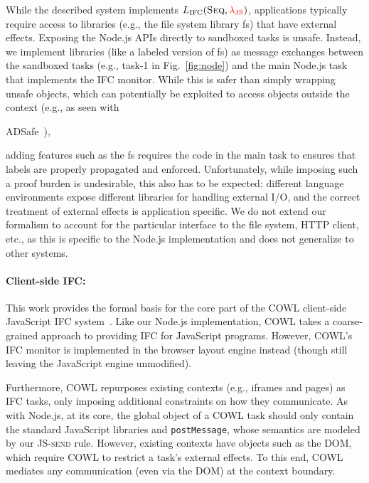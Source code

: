 \documentclass{llncs}
\newif\ifextended
\newcommand{\Red}[1]{{\color{red} #1}}
\begin{document}
While the described system implements \ensuremath{L_\text{IFC}(\textsc{Seq},\Red{\lambda_{\text{JS}}})}, applications
typically require access to libraries (e.g., the file system library
\textsf{fs}) that have external effects.
Exposing the Node.js APIs directly to sandboxed tasks is unsafe.
Instead, we implement libraries (like a labeled version of \textsf{fs}) as
message exchanges between the sandboxed tasks (e.g., \textsf{task-1}
in Fig.~\ref{fig:node}) and the main Node.js task that implements
the IFC monitor.
While this is safer than simply wrapping unsafe objects, which can
potentially be exploited to access objects outside the context (e.g.,
as seen with
\ifextended
ADSafe, FBJS, and Caja~\cite{taly2011automated, maffeis2010object, maffeis2009language}),
\else
ADSafe~\cite{taly2011automated}),
\fi
adding features such as the
\textsf{fs} requires the code in the main task to ensures that labels
are properly propagated and enforced.
Unfortunately, while imposing such a proof burden
is undesirable, this also has to be expected:
different language environments expose different libraries for
handling external I/O, and the correct treatment of external effects
is application specific.
We do not extend our formalism to account for the  particular
interface to the file system, HTTP client, etc., as this is
specific to the Node.js implementation and does not generalize
to other systems.


\paragraph{Client-side IFC:}
This work provides the formal basis for the core part of the COWL
client-side JavaScript IFC system~\cite{swapi}.
Like our Node.js implementation, COWL takes a coarse-grained approach
to providing IFC for JavaScript programs.
However, COWL's IFC monitor is implemented in
the browser layout engine instead (though still leaving the JavaScript engine
unmodified).

Furthermore, COWL repurposes existing contexts (e.g., iframes and
pages) as IFC tasks, only imposing additional constraints on how they
communicate.
As with Node.js, at its core, the global object of a COWL task
should only contain the standard JavaScript libraries and
\texttt{postMessage}, whose semantics are modeled by our
\textsc{JS-send} rule.
However, existing contexts have objects such as the DOM, which
require COWL to restrict a task's external effects.
To this end, COWL mediates any communication (even via the DOM) at
the context boundary. 
\end{document}
